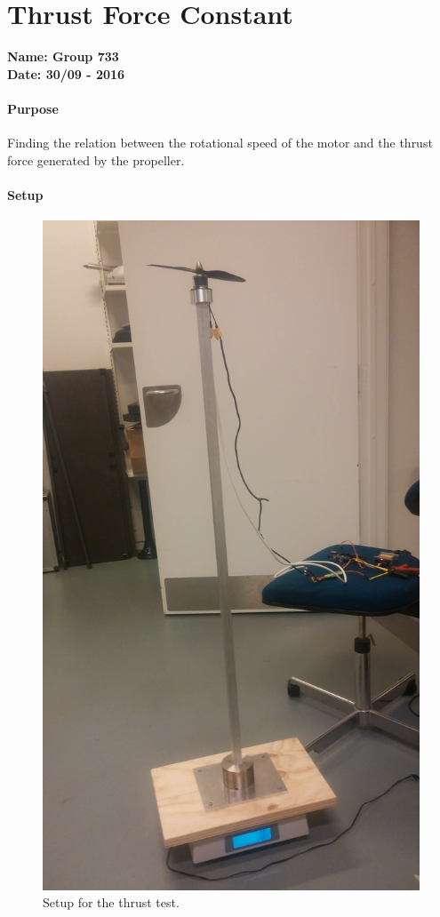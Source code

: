 \chapter{Thrust Force Constant}\label{app:ThrustTest} 
\textbf{Name: Group 733}\\
\textbf{Date: 30/09 - 2016}

\subsubsection{Purpose}
Finding the relation between the rotational speed of the motor and the thrust force generated by the propeller.

\subsubsection{Setup}
\begin{figure}[H]
	\centering
	\includegraphics[scale=0.05,angle =-90]{figures/ThrustTestSetup}
	\caption{Setup for the thrust test.}
	\label{ThrustTest}
\end{figure}

